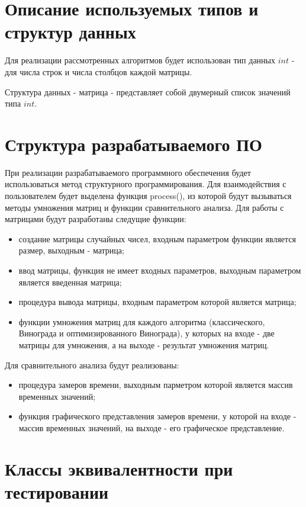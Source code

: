 \section{Описание используемых типов и структур данных}

Для реализации рассмотренных алгоритмов будет использован тип данных $int$ - для числа строк и числа столбцов каждой матрицы.

Структура данных - матрица - представляет собой двумерный список значений типа $int$.

\section{Структура разрабатываемого ПО}

При реализации разрабатываемого программного обеспечения будет использоваться метод структурного программирования. Для взаимодействия с пользователем будет выделена функция process(), из которой будут вызываться методы умножения матриц и функции сравнительного анализа. Для работы с матрицами будут разработаны следущие функции:

\begin{itemize}
	\item создание матрицы случайных чисел, входным параметром функции является размер, выходным - матрица;
	\item ввод матрицы, функция не имеет входных параметров, выходным параметром является введенная матрица;
	\item процедура вывода матрицы, входным параметром которой является матрица;
	\item функции умножения матриц для каждого алгоритма (классического, Винограда и оптимизированного Винограда), у которых на входе - две матрицы для умножения, а на выходе - результат умножения матриц. 
\end{itemize}

Для сравнительного анализа будут реализованы:

\begin{itemize}
	\item процедура замеров времени, выходным парметром которой является массив временных значений;
	\item функция графического представления замеров времени, у которой на входе - массив временных значений, на выходе - его графическое представление.
\end{itemize}

\section{Классы эквивалентности при тестировании}

